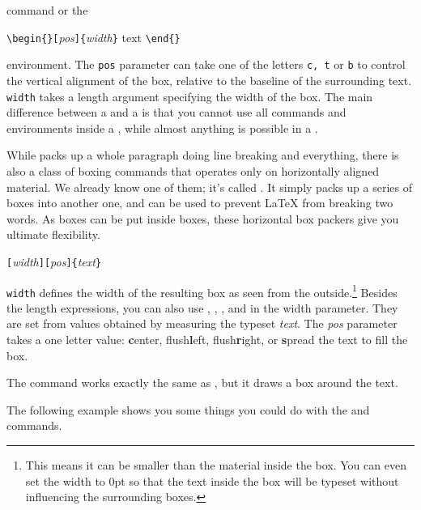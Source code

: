 \noindent command or the

\begin{lscommand}
\verb|\begin{|\verb|}[|\emph{pos}\verb|]{|\emph{width}\verb|}| text
\verb|\end{|\verb|}|
\end{lscommand}

\noindent environment. The \texttt{pos} parameter can take one of the letters
\texttt{c, t} or \texttt{b} to control the vertical alignment of the box,
relative to the baseline of the surrounding text. \texttt{width} takes
a length argument specifying the width of the box. The main difference
between a  and a  is that you cannot use all commands
and environments inside a , while almost anything is possible in
a .

While  packs up a whole paragraph doing line breaking and
everything, there is also a class of boxing commands that operates
only on horizontally aligned material. We already know one of them;
it's called . It simply packs up a series of boxes into
another one, and can be used to prevent \LaTeX{} from breaking two
words. As boxes can be put inside boxes, these horizontal box packers
give you ultimate flexibility.

\begin{lscommand}
\verb|[|\emph{width}\verb|][|\emph{pos}\verb|]{|\emph{text}\verb|}|
\end{lscommand}

\noindent \texttt{width} defines the width of the resulting box as
seen from the outside.\footnote{This means it can be smaller than the
material inside the box. You can even set the
width to 0pt so that the text inside the box will be typeset without
influencing the surrounding boxes.}  Besides the length
expressions, you can also use , , , and
 in the width parameter. They are set from values
obtained by measuring the typeset \emph{text}. The \emph{pos} parameter takes
a one letter value: \textbf{c}enter, flush\textbf{l}eft,
flush\textbf{r}ight, or \textbf{s}pread the text to fill the box.

The command  works exactly the same as , but
it draws a box around the text.

The following example shows you some things you could do with
the  and  commands.

